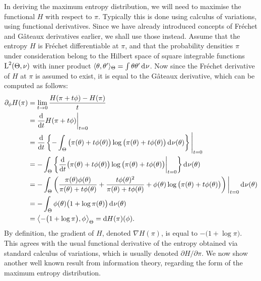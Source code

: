 In deriving the maximum entropy distribution, we will need to maximise the functional $H$ with respect to $\pi$.
Typically this is done using calculus of variations, using functional derivatives.
Since we have already introduced concepts of Fréchet and Gâteaux derivatives earlier, we shall use those instead.
Assume that the entropy $H$ is Fréchet differentiable at $\pi$, and that the probability densities $\pi$ under consideration belong to the Hilbert space of square integrable functions $\text{L}^2(\Theta,\nu)$ with inner product $\langle\theta,\theta'\rangle_\Theta = \int \theta\theta' \operatorname{d}\hspace{0.5pt}\!\nu$.
Now since the Fréchet derivative of $H$ at $\pi$ is assumed to exist, it is equal to the Gâteaux derivative, which can be computed as follows:
\begin{align*}
  \partial_\phi H(\pi) 
  &= \lim_{t\to 0} \frac{H(\pi + t\phi) - H(\pi)}{t} \\
  &= \frac{\text{d}}{\text{d} t} H(\pi + t\phi)  \bigg|_{t=0} \\
  &= \frac{\text{d}}{\text{d} t} \left\{ - \int_\Theta \big(\pi(\theta) + t\phi(\theta)\big) \log \big(\pi(\theta) + t\phi(\theta)\big) \operatorname{d}\hspace{0.5pt}\!\nu(\theta) \right\} \Bigg|_{t=0} \\
  &= - \int_\Theta \left\{ \frac{\text{d}}{\text{d} t} \big(\pi(\theta) + t\phi(\theta)\big) \log \big(\pi(\theta) + t\phi(\theta)\big) \bigg|_{t=0} \right\} \operatorname{d}\hspace{0.5pt}\!\nu(\theta)  \\
  &= -\int_\Theta \left( 
    \frac{\pi(\theta)\phi(\theta)}{\pi(\theta)+t\phi(\theta)}
    + \frac{t\phi(\theta)^2}{\pi(\theta) + t\phi(\theta)}
    + \phi(\theta)\log\big( \pi(\theta) + t\phi(\theta) \big)
    \right)\bigg|_{t=0} \operatorname{d}\hspace{0.5pt}\!\nu(\theta) \\
  &= -\int_\Theta \phi(\theta)\big(1 + \log \pi(\theta) \big) \operatorname{d}\hspace{0.5pt}\!\nu(\theta) \\
  &= \left\langle -\big( 1 + \log \pi \big), \phi \right\rangle_\Theta = \text{d} H(\pi)(\phi).   
\end{align*}
By definition, the gradient of $H$, denoted $\nabla H(\pi)$, is equal to $-\big( 1 + \log \pi \big)$.
This agrees with the usual functional derivative of the entropy obtained via standard calculus of variations, which is usually denoted $\partial H / \partial \pi$.
We now show another well known result from information theory, regarding the form of the maximum entropy distribution.

